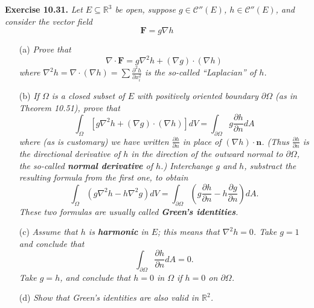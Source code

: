 \documentclass{article}
\begin{document}
\textbf{Exercise 10.31.}
\emph{Let $E \subseteq \mathbb{R}^3$ be open,
suppose $g \in \mathscr{C}''(E)$, $h \in \mathscr{C}''(E)$,
and consider the vector field}
\[
    \mathbf{F} = g \nabla h
\]
\begin{enumerate}
\item[(a)]
  \emph{Prove that
  \[
    \nabla \cdot \mathbf{F} = g \nabla^2 h + (\nabla g) \cdot (\nabla h)
  \]
  where $\nabla^2 h = \nabla \cdot (\nabla h) = \sum\frac{\partial^2 h}{\partial x_i^2}$
  is the so-called ``Laplacian'' of $h$.}

\item[(b)]
  \emph{If $\Omega$ is a closed subset of $E$ with positively oriented boundary $\partial \Omega$
  (as in Theorem 10.51), prove that
  \[
    \int_{\Omega} [ g\nabla^2 h + (\nabla g)\cdot(\nabla h) ] dV
    = \int_{\partial \Omega} g \frac{\partial h}{\partial n} dA
  \]
  where (as is customary) we have written $\frac{\partial h}{\partial n}$
  in place of $(\nabla h) \cdot \mathbf{n}$.
  (Thus $\frac{\partial h}{\partial n}$ is the directional derivative of $h$
  in the direction of the outward normal to $\partial \Omega$,
  the so-called \textbf{normal derivative} of $h$.)
  Interchange $g$ and $h$,
  substract the resulting formula from the first one, to obtain
  \[
    \int_{\Omega} ( g\nabla^2 h - h \nabla^2 g) dV
    = \int_{\partial \Omega}
      \left( g \frac{\partial h}{\partial n} - h \frac{\partial g}{\partial n} \right) dA.
  \]
  These two formulas are usually called \textbf{Green's identities}.}

\item[(c)]
  \emph{Assume that $h$ is \textbf{harmonic} in $E$;
  this means that $\nabla^2 h = 0$.
  Take $g = 1$ and conclude that
  \[
    \int_{\partial \Omega} \frac{\partial h}{\partial n} dA = 0.
  \]
  Take $g = h$, and conclude that $h = 0$ in $\Omega$ if $h = 0$ on $\partial \Omega$.}

\item[(d)]
  \emph{Show that Green's identities are also valid in $\mathbb{R}^2$.} \\
\end{enumerate}
\end{document}
